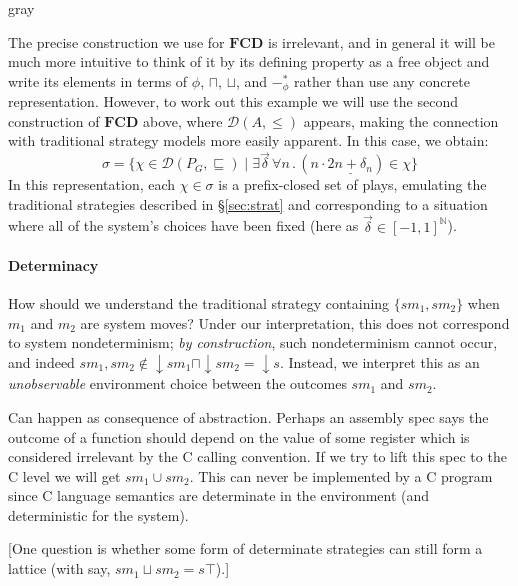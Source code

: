 \documentclass[format=sigplan,authordraft]{acmart}
\begin{document}
\begin{color}{gray}

The precise construction we use for $\mathbf{FCD}$ is irrelevant,
and in general it will be much more intuitive
to think of it by its defining property as a free object and
write its elements in terms of $\phi$, $\sqcap$, $\sqcup$, and $-_\phi^*$
rather than use any concrete representation.
However, to work out this example
we will use the second construction of $\mathbf{FCD}$ above,
where $\mathcal{D}(A, {\le})$ appears,
making the connection with traditional strategy models
more easily apparent.
In this case, we obtain:
\[
    \sigma =
    \{ \chi \in \mathcal{D}(P_G, {\sqsubseteq}) \mid
       \exists \vec{\delta} \,
       \forall n \,.\,
       (n \cdot \underline{2n + \delta_n}) \in \chi \}
\]
In this representation,
each $\chi \in \sigma$
is a prefix-closed set of plays,
emulating the traditional strategies described in \S\ref{sec:strat}
and corresponding to a situation where all of the system's choices
have been fixed (here as $\vec{\delta} \in [-1,1]^\mathbb{N}$).

\end{color}


\paragraph{Determinacy}

How should we understand
the traditional strategy containing $\{ sm_1, sm_2 \}$
when $m_1$ and $m_2$ are system moves?
Under our interpretation,
this does not correspond to
system nondeterminism;
\emph{by construction},
such nondeterminism cannot occur,
and indeed
$s m_1, s m_2 \notin
 {\downarrow} s m_1 \sqcap {\downarrow} s m_2 =
 {\downarrow} s$.
Instead,
we interpret this as an \emph{unobservable}
environment choice
between the outcomes $s m_1$ and $s m_2$.

Can happen as consequence of abstraction.
Perhaps an assembly spec says
the outcome of a function should depend on the value of some
register which is considered irrelevant by the C calling convention.
If we try to lift this spec to the C level
we will get $s m_1 \cup s m_2$.
This can never be implemented by a C program
since C language semantics are determinate in the environment
(and deterministic for the system).

[One question is whether
some form of determinate strategies
can still form a lattice
(with say, $sm_1 \sqcup sm_2 = s \top$).]
\end{document}
